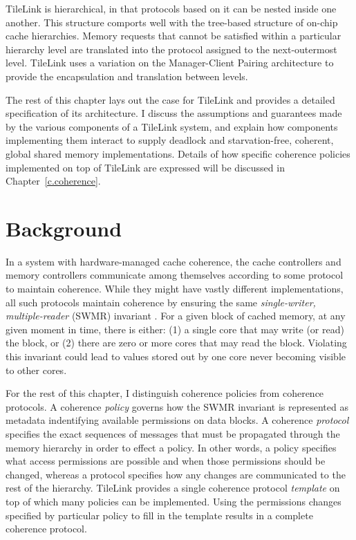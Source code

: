TileLink is hierarchical, in that protocols based on it can be nested inside one another.
This structure comports well with the tree-based structure of on-chip cache hierarchies.
Memory requests that cannot be satisfied within a particular hierarchy level are translated into the protocol assigned to the next-outermost level. 
TileLink uses a variation on the Manager-Client Pairing architecture to provide the encapsulation and translation between levels.

The rest of this chapter lays out the case for TileLink and provides a detailed specification of its architecture.
I discuss the assumptions and guarantees made by the various components of a TileLink system, and explain how components implementing them interact
to supply deadlock and starvation-free, coherent, global shared memory implementations.
Details of how specific coherence policies implemented on top of TileLink are expressed will be discussed in Chapter~\ref{c.coherence}.

\section{Background}

In a system with hardware-managed cache coherence, the cache controllers and memory controllers
communicate among themselves according to some protocol to maintain coherence.
While they might have vastly different implementations, 
all such protocols maintain coherence by ensuring the same {\em single-writer, multiple-reader} (SWMR) invariant \cite{sorin2011primer}. 
For a given block of cached memory, at any given moment in time, there is either: 
(1) a single core that may write (or read) the block, or 
(2) there are zero or more cores that may read the block.
Violating this invariant could lead to values stored out by one core never becoming visible to other cores.

For the rest of this chapter, I distinguish coherence policies from coherence protocols.
A coherence {\em policy} governs how the SWMR invariant is represented as metadata indentifying available permissions on data blocks.
A coherence {\em protocol} specifies the exact sequences of messages that must be propagated through the memory hierarchy in order to effect a policy.
In other words, a policy specifies what access permissions are possible and when those permissions should be changed,
whereas a protocol specifies how any changes are communicated to the rest of the hierarchy.
TileLink provides a single coherence protocol {\em template} on top of which many policies can be implemented.
Using the permissions changes specified by particular policy to fill in the template results in a complete coherence protocol.


